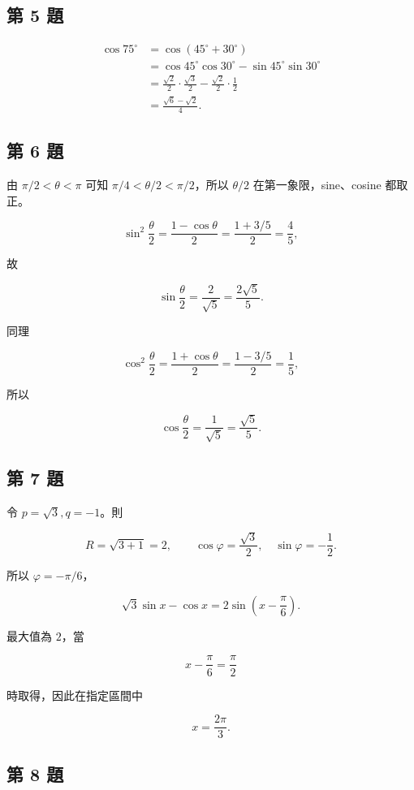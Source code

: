 \documentclass[11pt,a4paper]{article}
\begin{document}
\subsection{第 5 題}\label{ux7b2c-5-ux984c}

\[
\begin{aligned}
\cos75^\circ
&=\cos(45^\circ+30^\circ)\\
&=\cos45^\circ\cos30^\circ
-\sin45^\circ\sin30^\circ\\
&=\frac{\sqrt2}{2}\cdot\frac{\sqrt3}{2}
-\frac{\sqrt2}{2}\cdot\frac12\\
&=\boxed{\frac{\sqrt6-\sqrt2}{4}}.
\end{aligned}
\]

\subsection{第 6 題}\label{ux7b2c-6-ux984c}

由 \(\pi/2<\theta<\pi\) 可知 \(\pi/4<\theta/2<\pi/2\)，所以 \(\theta/2\) 在第一象限，sine、cosine 都取正。

\[
\sin^2\frac\theta2
=\frac{1-\cos\theta}{2}
=\frac{1+3/5}{2}
=\frac45,
\]

故

\[
\boxed{\sin\frac\theta2=\frac{2}{\sqrt5}=\frac{2\sqrt5}{5}}.
\]

同理

\[
\cos^2\frac\theta2
=\frac{1+\cos\theta}{2}
=\frac{1-3/5}{2}
=\frac15,
\]

所以

\[
\boxed{\cos\frac\theta2=\frac{1}{\sqrt5}=\frac{\sqrt5}{5}}.
\]

\subsection{第 7 題}\label{ux7b2c-7-ux984c}

令 \(p=\sqrt3,q=-1\)。則

\[
R=\sqrt{3+1}=2,
\qquad
\cos\varphi=\frac{\sqrt3}{2},
\quad
\sin\varphi=-\frac12.
\]

所以 \(\varphi=-\pi/6\)，

\[
\sqrt3\sin x-\cos x
=\boxed{2\sin\left(x-\frac\pi6\right)}.
\]

最大值為 \(2\)，當

\[
x-\frac\pi6=\frac\pi2
\]

時取得，因此在指定區間中

\[
\boxed{x=\frac{2\pi}{3}}.
\]

\subsection{第 8 題}\label{ux7b2c-8-ux984c}
\end{document}

